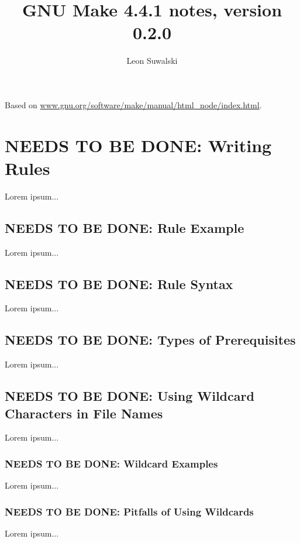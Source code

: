 \documentclass{charun}
\title{GNU Make 4.4.1 notes, version 0.2.0}
\author{Leon Suwalski}
\begin{document}
\begin{multicols*}{2}
\maketitle
\raggedright

Based on \url{www.gnu.org/software/make/manual/html_node/index.html}.





\color{gray}
\section{NEEDS TO BE DONE: Writing Rules}
Lorem ipsum...
\color{black}


\color{gray}
\subsection{NEEDS TO BE DONE: Rule Example}
Lorem ipsum...
\color{black}

\color{gray}
\subsection{NEEDS TO BE DONE: Rule Syntax}
Lorem ipsum...
\color{black}

\color{gray}
\subsection{NEEDS TO BE DONE: Types of Prerequisites}
Lorem ipsum...
\color{black}

\color{gray}
\subsection{NEEDS TO BE DONE: Using Wildcard Characters in File Names}
Lorem ipsum...
\color{black}

\color{gray}
\subsubsection{NEEDS TO BE DONE: Wildcard Examples}
Lorem ipsum...
\color{black}

\color{gray}
\subsubsection{NEEDS TO BE DONE: Pitfalls of Using Wildcards}
Lorem ipsum...
\color{black}


\end{multicols*}
\end{document}

